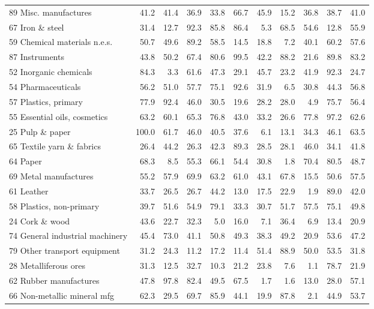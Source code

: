 \begin{tabular}{lrrrrrrrrrr}
89 Misc. manufactures & 41.2 & 41.4 & 36.9 & 33.8 & 66.7 & 45.9 & 15.2 & 36.8 & 38.7 & 41.0 \\
67 Iron \& steel & 31.4 & 12.7 & 92.3 & 85.8 & 86.4 & 5.3 & 68.5 & 54.6 & 12.8 & 55.9 \\
59 Chemical materials n.e.s. & 50.7 & 49.6 & 89.2 & 58.5 & 14.5 & 18.8 & 7.2 & 40.1 & 60.2 & 57.6 \\
87 Instruments & 43.8 & 50.2 & 67.4 & 80.6 & 99.5 & 42.2 & 88.2 & 21.6 & 89.8 & 83.2 \\
52 Inorganic chemicals & 84.3 & 3.3 & 61.6 & 47.3 & 29.1 & 45.7 & 23.2 & 41.9 & 92.3 & 24.7 \\
54 Pharmaceuticals & 56.2 & 51.0 & 57.7 & 75.1 & 92.6 & 31.9 & 6.5 & 30.8 & 44.3 & 56.8 \\
57 Plastics, primary & 77.9 & 92.4 & 46.0 & 30.5 & 19.6 & 28.2 & 28.0 & 4.9 & 75.7 & 56.4 \\
55 Essential oils, cosmetics & 63.2 & 60.1 & 65.3 & 76.8 & 43.0 & 33.2 & 26.6 & 77.8 & 97.2 & 62.6 \\
25 Pulp \& paper & 100.0 & 61.7 & 46.0 & 40.5 & 37.6 & 6.1 & 13.1 & 34.3 & 46.1 & 63.5 \\
65 Textile yarn \& fabrics & 26.4 & 44.2 & 26.3 & 42.3 & 89.3 & 28.5 & 28.1 & 46.0 & 34.1 & 41.8 \\
64 Paper & 68.3 & 8.5 & 55.3 & 66.1 & 54.4 & 30.8 & 1.8 & 70.4 & 80.5 & 48.7 \\
69 Metal manufactures & 55.2 & 57.9 & 69.9 & 63.2 & 61.0 & 43.1 & 67.8 & 15.5 & 50.6 & 57.5 \\
61 Leather & 33.7 & 26.5 & 26.7 & 44.2 & 13.0 & 17.5 & 22.9 & 1.9 & 89.0 & 42.0 \\
58 Plastics, non-primary & 39.7 & 51.6 & 54.9 & 79.1 & 33.3 & 30.7 & 51.7 & 57.5 & 75.1 & 49.8 \\
24 Cork \& wood & 43.6 & 22.7 & 32.3 & 5.0 & 16.0 & 7.1 & 36.4 & 6.9 & 13.4 & 20.9 \\
74 General industrial machinery & 45.4 & 73.0 & 41.1 & 50.8 & 49.3 & 38.3 & 49.2 & 20.9 & 53.6 & 47.2 \\
79 Other transport equipment & 31.2 & 24.3 & 11.2 & 17.2 & 11.4 & 51.4 & 88.9 & 50.0 & 53.5 & 31.8 \\
28 Metalliferous ores & 31.3 & 12.5 & 32.7 & 10.3 & 21.2 & 23.8 & 7.6 & 1.1 & 78.7 & 21.9 \\
62 Rubber manufactures & 47.8 & 97.8 & 82.4 & 49.5 & 67.5 & 1.7 & 1.6 & 13.0 & 28.0 & 57.1 \\
66 Non-metallic mineral mfg & 62.3 & 29.5 & 69.7 & 85.9 & 44.1 & 19.9 & 87.8 & 2.1 & 44.9 & 53.7 \\

\end{tabular}
